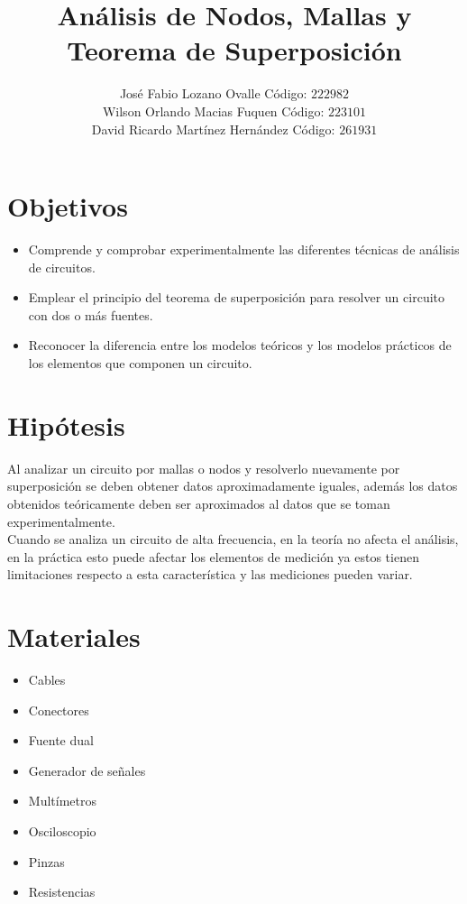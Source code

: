 \documentclass[twocolumn]{IEEEtran}
\begin{document}
\title{Análisis de Nodos, Mallas y Teorema de Superposición}
\author{José Fabio Lozano Ovalle Código: $222982$\\
	Wilson Orlando Macias Fuquen Código: $223101$\\
	David Ricardo Martínez Hernández Código: $261931$}
\maketitle
{}
\section{Objetivos}
\begin{itemize}
 \item Comprende y comprobar experimentalmente las diferentes técnicas de análisis de circuitos.
 \item Emplear el principio del teorema de superposición para resolver un circuito con dos o más fuentes.
 \item Reconocer la diferencia entre los modelos teóricos y los modelos prácticos de los elementos que componen un circuito.
\end{itemize}

\section{Hipótesis}
\noindent
Al analizar un circuito por mallas o nodos y resolverlo nuevamente por superposición se deben obtener datos aproximadamente iguales,  además los datos obtenidos teóricamente deben ser aproximados al datos que se toman experimentalmente.\\
Cuando se  analiza un circuito de alta frecuencia, en la teoría no afecta el análisis, en la práctica esto puede afectar los elementos de medición ya estos tienen limitaciones respecto a esta característica y las mediciones pueden variar.

\section{Materiales}
\begin{itemize}
 \item Cables
 \item Conectores
 \item Fuente dual
 \item Generador de señales
 \item Multímetros
 \item Osciloscopio
 \item Pinzas
 \item Resistencias
\end{itemize}
\end{document}
